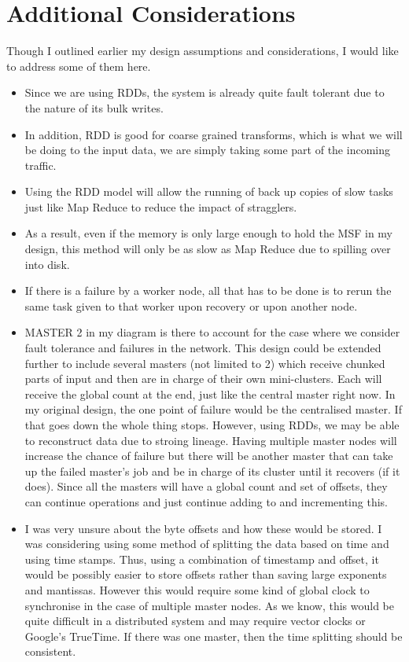 \documentclass[11pt]{article}
\begin{document}
\section{Additional Considerations}
Though I outlined earlier my design assumptions and considerations, 
I would like to address some of them here. 
\begin{itemize}
\item Since we are using RDDs, the system is already quite fault tolerant
due to the nature of its bulk writes.
\item In addition, RDD is good for coarse grained transforms, which is
what we will be doing to the input data, we are simply taking some part
of the incoming traffic. 
\item Using the RDD model will allow the running of back up copies of slow 
tasks just like Map Reduce to reduce the impact of stragglers.
\item As a result, even if the memory is only large enough to hold the MSF
in my design, this method will only be as slow as Map Reduce due to spilling 
over into disk.
\item If there is a failure by a worker node, all that has to be done is
to rerun the same task given to that worker upon recovery or upon another
node.
\item MASTER 2 in my diagram is there to account for the case where we 
consider fault tolerance and failures in the network. This design could
be extended further to include several masters (not limited to 2) which 
receive chunked parts
of input and then are in charge of their own mini-clusters. Each will 
receive the global count at the end, just like the central master right now.
In my original design, the one point of failure would be the centralised
master. If that goes down the whole thing stops. However, using RDDs, we may
be able to reconstruct data due to stroing lineage. Having multiple
master nodes will increase the chance of failure but there will be another
master that can take up the failed master's job and be in charge of its
cluster until it recovers (if it does). Since all the masters will have a 
global count and set of offsets, they can continue operations and just 
continue adding to and incrementing this. 
\item I was very unsure about the byte offsets and how these would be 
stored. I was considering using some method of splitting the data based on
time and using time stamps. Thus, using a combination of timestamp and 
offset, it would be possibly easier to store offsets rather than saving
large exponents and mantissas. However this would require some kind of 
global clock to synchronise in the case of multiple master nodes. As we
know, this would be quite difficult in a distributed system and may 
require vector clocks or Google's TrueTime. If
there was one master, then the time splitting should be consistent.
 
\end{itemize}
\end{document}
